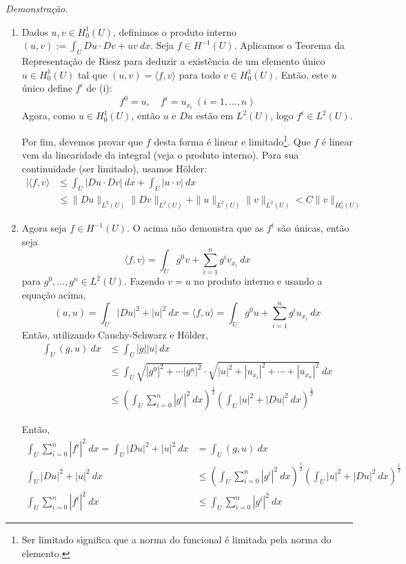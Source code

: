 \documentclass[a4paper, 11pt]{book}
\begin{document}
\textit{Demonstração.} 
\begin{enumerate}
	\item Dados $u,v \in H^1_0(U)$, definimos o produto interno $(u,v):= \int_U Du\cdot Dv + uv\ dx$. Seja $f \in H^{-1}(U)$. Aplicamos o Teorema da Representação de Riesz para deduzir a existência de um elemento único $u \in H^1_0(U)$ tal que $(u,v)=\langle f, v \rangle$ para todo $v \in H^1_0(U)$. Então, este $u$ único define $f^i$ de (i):\[
	f^0=u, \quad f^i = u_{x_i} \ (i = 1,\dots,n)
	\]
	Agora, como $u \in H^1_0(U)$, então $u$ e $Du$ estão em $L^2(U)$, logo $f^i \in L^2(U)$.

	Por fim, devemos provar que $f$ desta forma é linear e limitado\footnote{Ser limitado significa que a norma do funcional é limitada pela norma do elemento.}. Que $f$ é linear vem da linearidade da integral (veja o produto interno). Para sua continuidade (ser limitado), usamos Hölder:
	\begin{align*}
		| \langle f, v \rangle  &\leq \int_U | Du \cdot Dv | \ dx + \int_U | u \cdot v | \ dx  \\
		&\leq \|Du\|_{L^2(U)}\|Dv\|_{L^2(U)} + \|u\|_{L^2(U)}\|v\|_{L^2(U)} < C \|v\|_{H^1_0(U)}
	\end{align*}	

	\item Agora seja $f \in H^{-1}(U)$. O acima não demonstra que as $f^i$ são únicas, então seja \[
	\langle f, v \rangle = \int_{U} g^0 v + \sum_{i=1}^{n}g^i v_{x_i}\ dx	
	\]
	para $g^0, \dots, g^n \in L^2(U)$. Fazendo $v=u$ no produto interno e usando a equação acima, \[
	(u,u) = \int_U |Du|^2 + |u|^2 \ dx = \langle f, u \rangle = \int_U g^0u + \sum_{i=1}^{n}g^i u_{x_i}\ dx 
	\]
	Então, utilizando Cauchy-Schwarz e Hölder,
	\begin{align*}
		\int_U (g, u)\ dx &\leq \int_U |g| |u| \ dx \\
		&\leq \int_U \sqrt{|g^0|^2 + \cdots |g^n|^2} \cdot \sqrt{|u|^2 + |u_{x_i}|^2 + \cdots + |u_{x_n}|^2} \ dx  \\
		&\leq \left( \int_U \sum_{i=0}^{n} |g^i|^2 \ dx \right)^{\frac{1}{2}} \left( \int_U |u|^2 + |Du|^2 \ dx \right)^{\frac{1}{2}}
	\end{align*}

	Então, \begin{align*}
		\int_U \sum_{i=0}^{n} |f^i|^2 \ dx = \int_U |Du|^2 + |u|^2 \ dx &= \int_U (g, u)\ dx \\
		\int_U |Du|^2 + |u|^2 \ dx &\leq \left( \int_U \sum_{i=0}^{n} |g^i|^2 \ dx \right)^{\frac{1}{2}} \left( \int_U |u|^2 + |Du|^2 \ dx \right)^{\frac{1}{2}} \\
		\int_U \sum_{i=0}^{n} |f^i|^2 \ dx &\leq \int_U \sum_{i=0}^{n} |g^i|^2 \ dx
	\end{align*}


\end{enumerate}
\end{document}
